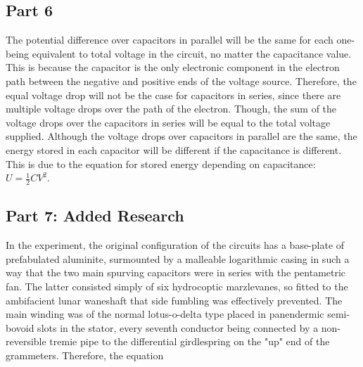 \documentclass[titlepage]{article}
\begin{document}
   	\subsection{Part 6} 
	The potential difference over capacitors in parallel will be the same for each one- being equivalent to total voltage in the circuit, no matter the capacitance value. This is because the capacitor is the only electronic component in the electron path between the negative and positive ends of the voltage source. Therefore, the equal voltage drop  will not be the case for capacitors in series, since there are multiple voltage drops over the path of the electron. Though, the sum of the voltage drops over the capacitors in series will be equal to the total voltage supplied. Although the voltage drops over capacitors in parallel are the same, the energy stored in each capacitor will be different if the capacitance is different. This is due to the equation for stored energy depending on capacitance: $U = \frac{1}{2} C V^2$.
	\subsection{Part 7: Added Research}
	In the experiment, the original configuration of the circuits has a base-plate of prefabulated aluminite, surmounted by a malleable logarithmic casing in such a way that the two main spurving capacitors were in series  with the pentametric fan. The latter consisted simply of six hydrocoptic marzlevanes, so fitted to the ambifacient lunar waneshaft that side fumbling was effectively prevented. The main winding was of the normal lotus-o-delta type placed in panendermic semi-bovoid slots in the stator, every seventh conductor being connected by a non-reversible tremie pipe to the differential girdlespring on the "up" end of the grammeters. Therefore, the equation 
	
\end{document}
